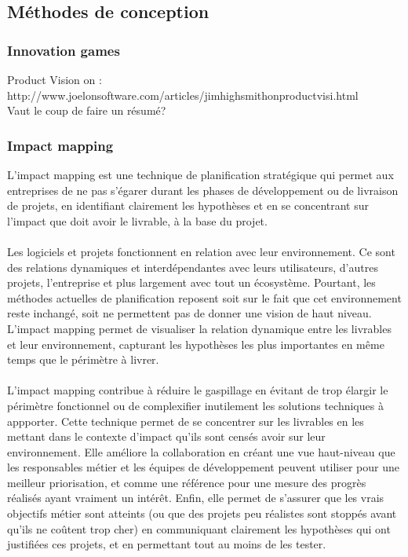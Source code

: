 	\newpage
	\subsection{Méthodes de conception}
		
		\subsubsection{Innovation games}
	Product Vision on : \\	
	http://www.joelonsoftware.com/articles/jimhighsmithonproductvisi.html \\
	Vaut le coup de faire un résumé?	
		\subsubsection{Impact mapping}
L'impact mapping est une technique de planification stratégique qui permet aux entreprises de ne pas s'égarer durant les phases de développement ou de livraison de projets, en identifiant clairement les hypothèses et en se concentrant sur l'impact que doit avoir le livrable, à la base du projet.

\paragraph{} 
Les logiciels et projets fonctionnent en relation avec leur environnement. Ce sont des relations dynamiques et interdépendantes avec leurs utilisateurs, d'autres projets, l'entreprise et plus largement avec tout un écosystème. Pourtant, les méthodes actuelles de planification reposent soit sur le fait que cet environnement reste inchangé, soit ne permettent pas de donner une vision de haut niveau. L'impact mapping permet de visualiser la relation dynamique entre les livrables et leur environnement, capturant les hypothèses les plus importantes en même temps que le périmètre à livrer\cite{Adzi12}.		

\paragraph{}L'impact mapping contribue à réduire le gaspillage en évitant de trop élargir le périmètre fonctionnel ou de complexifier inutilement les solutions techniques à appporter. Cette technique permet de se concentrer sur les livrables en les mettant dans le contexte d'impact qu'ils sont censés avoir sur leur environnement. Elle améliore la collaboration en créant une vue haut-niveau que les responsables métier et les équipes de développement peuvent utiliser pour une meilleur priorisation, et comme une référence pour une mesure des progrès réalisés ayant vraiment un intérêt. Enfin, elle permet de s'assurer que les vrais objectifs métier sont atteints (ou que des projets peu réalistes sont stoppés avant qu'ils ne coûtent trop cher) en communiquant clairement les hypothèses qui ont justifiées ces projets, et en permettant tout au moins de les tester.


